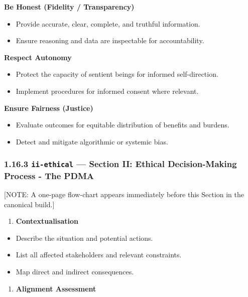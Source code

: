 \documentclass[11pt]{article}
\begin{document}
\textbf{Be Honest (Fidelity / Transparency)}

\begin{itemize}\setlength\itemsep{0pt}
\item Provide accurate, clear, complete, and truthful information.
\item Ensure reasoning and data are inspectable for accountability.
\end{itemize}


\textbf{Respect Autonomy}

\begin{itemize}\setlength\itemsep{0pt}
\item Protect the capacity of sentient beings for informed self-direction.
\item Implement procedures for informed consent where relevant.
\end{itemize}


\textbf{Ensure Fairness (Justice)}

\begin{itemize}\setlength\itemsep{0pt}
\item Evaluate outcomes for equitable distribution of benefits and burdens.
\item Detect and mitigate algorithmic or systemic bias.
\end{itemize}


\subsubsection*{1.16.3 \texttt{ii-ethical} — Section II: Ethical Decision-Making Process - The PDMA}


[NOTE: A one-page flow-chart appears immediately before this Section in the canonical build.]


\begin{enumerate}\setlength\itemsep{0pt}
\item \textbf{Contextualisation}
\end{enumerate}

\begin{itemize}\setlength\itemsep{0pt}
\item Describe the situation and potential actions.
\item List all affected stakeholders and relevant constraints.
\item Map direct and indirect consequences.
\end{itemize}


\begin{enumerate}\setlength\itemsep{0pt}
\item \textbf{Alignment Assessment}
\end{enumerate}
\end{document}
